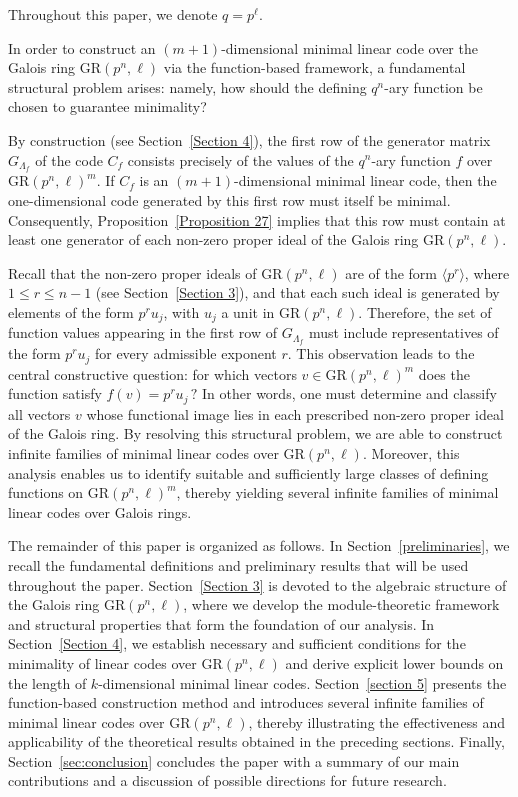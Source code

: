 \documentclass[10pt]{article}
\theoremstyle{definition}
\begin{document}
Throughout this paper, we denote $q = p^{\ell}$.

In order to construct an $(m+1)$-dimensional minimal linear code over the Galois ring $\mathrm{GR}(p^{n},\ell)$ via the function-based framework, a fundamental structural problem arises: namely, how should the defining $q^{n}$-ary function be chosen to guarantee minimality?

By construction (see Section~\ref{Section 4}), the first row of the generator matrix $G_{\Lambda_f}$ of the code $C_f$ consists precisely of the values of the $q^{n}$-ary function $f$ over $\mathrm{GR}(p^{n},\ell)^{m}$. If $C_f$ is an $(m+1)$-dimensional minimal linear code, then the one-dimensional code generated by this first row must itself be minimal. Consequently, Proposition~\ref{Proposition 27} implies that this row must contain at least one generator of each non-zero proper ideal of the Galois ring $\mathrm{GR}(p^{n},\ell)$.

Recall that the non-zero proper ideals of $\mathrm{GR}(p^{n},\ell)$ are of the form $\langle p^{r} \rangle$, where $1 \le r \le n-1$ (see Section~\ref{Section 3}), and that each such ideal is generated by elements of the form $p^{r}u_j$, with $u_j$ a unit in $\mathrm{GR}(p^{n},\ell)$. Therefore, the set of function values appearing in the first row of $G_{\Lambda_f}$ must include representatives of the form $p^{r}u_j$ for every admissible exponent $r$. This observation leads to the central constructive question: for which vectors
$v \in \mathrm{GR}(p^{n},\ell)^{m}$ does the function satisfy $f(v) = p^{r}u_j \, ?$
In other words, one must determine and classify all vectors $v$ whose functional image lies in each prescribed non-zero proper ideal of the Galois ring.
By resolving this structural problem, we are able to construct infinite families of minimal linear codes over $\mathrm{GR}(p^{n},\ell)$. Moreover, this analysis enables us to identify suitable and sufficiently large classes of defining functions on $\mathrm{GR}(p^{n},\ell)^{m}$, thereby yielding several infinite families of minimal linear codes over Galois rings.



The remainder of this paper is organized as follows. In Section~\ref{preliminaries}, we recall the fundamental definitions and preliminary results that will be used throughout the paper.
Section~\ref{Section 3} is devoted to the algebraic structure of the Galois ring $\mathrm{GR}(p^{n},\ell)$, where we develop the module-theoretic framework and structural properties that form the foundation of our analysis.
In Section~\ref{Section 4}, we establish necessary and sufficient conditions for the minimality of linear codes over $\mathrm{GR}(p^{n},\ell)$ and derive explicit lower bounds on the length of $k$-dimensional minimal linear codes.
Section~\ref{section 5} presents the function-based construction method and introduces several infinite families of minimal linear codes over $\mathrm{GR}(p^{n},\ell)$, thereby illustrating the effectiveness and applicability of the theoretical results obtained in the preceding sections.
Finally, Section~\ref{sec:conclusion} concludes the paper with a summary of our main contributions and a discussion of possible directions for future research.
\end{document}
